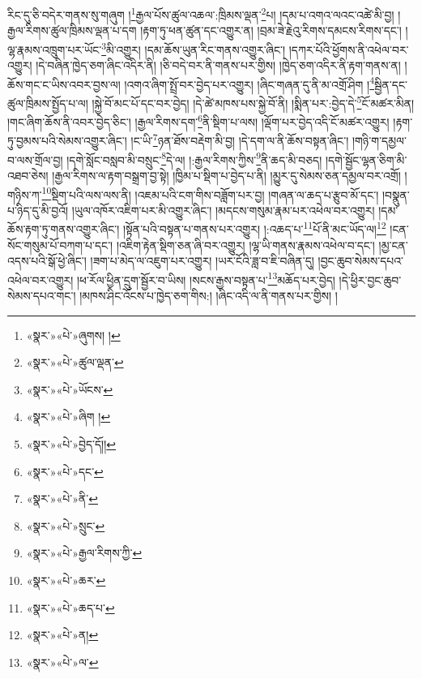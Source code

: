 རིང་དུ་ཅི་བདེར་གནས་སུ་གཞུག །\footnote{«སྣར་»«པེ་»ཞུགས། །}རྒྱལ་པོས་ཚུལ་འཆལ་:ཁྲིམས་ལྡན་\footnote{«སྣར་»«པེ་»ཚུལ་ལྡན་}པ། །དམ་པ་འགའ་ལའང་འཚེ་མི་བྱ། །རྒྱལ་རིགས་ཚུལ་ཁྲིམས་ལྡན་པ་དག །རྟག་ཏུ་ཕན་ཚུན་དང་འགྱུར་ན། །བྲམ་ཟེ་རྗེའུ་རིགས་དམངས་རིགས་དང་། །ལྷ་རྣམས་འཁྲུག་པར་ཡོང་\footnote{«སྣར་»«པེ་»ཡོངས་}མི་འགྱུར། །དམ་ཆོས་ཡུན་རིང་གནས་འགྱུར་ཞིང་། །དཀར་པོའི་ཕྱོགས་ནི་འཕེལ་བར་འགྱུར། །དེ་བཞིན་ཁྱེད་ཅག་ཞིང་འདིར་ནི། །ཅི་བདེ་བར་ནི་གནས་པར་གྱིས། །ཁྱེད་ཅག་འདིར་ནི་རྟག་གནས་ན། །ཆོས་གང་ང་ཡིས་འབར་བྱས་ལ། །འགའ་ཞིག་སྤྲོ་བར་བྱེད་པར་འགྱུར། །ཞིང་གཞན་དུ་ནི་མ་འགྲོ་ཤིག །\footnote{«སྣར་»«པེ་»ཞིག །}སྦྱིན་དང་ཚུལ་ཁྲིམས་སྤྱོད་པ་ལ། །སྐྱེ་བོ་མང་པོ་དང་བར་བྱེད། །དེ་ཚེ་མཁས་པས་སྐྱེ་བོ་ནི། །སྨིན་པར་:བྱེད་དེ་\footnote{«སྣར་»«པེ་»བྱེད་དོ།།}ངོ་མཚར་མིན། །གང་ཞིག་ཆོས་ནི་འབར་བྱེད་ཅིང་། །རྒྱལ་རིགས་དག་\footnote{«སྣར་»«པེ་»དང་}ནི་སྡིག་པ་ལས། །ལྡོག་པར་བྱེད་འདི་ངོ་མཚར་འགྱུར། །རྟག་ཏུ་བྱམས་པའི་སེམས་འགྱུར་ཞིང་། །ང་ཡི་\footnote{«སྣར་»«པེ་»ནི་}ཉན་ཐོས་བརྡེག་མི་བྱ། །དེ་དག་ལ་ནི་ཆོས་བསྟན་ཞིང་། །གཉི་ག་དམྱལ་བ་ལས་གྲོལ་བྱ། །དགེ་སློང་བསླབ་མི་བསྲུང་\footnote{«སྣར་»«པེ་»སྲུང་}དེ་ལ། །:རྒྱལ་རིགས་ཀྱིས་\footnote{«སྣར་»«པེ་»རྒྱལ་རིགས་ཀྱི་}ནི་ཆད་མི་བཅད། །དགེ་སྦྱོང་ལྷན་ཅིག་མི་འཐབ་ཅེས། །རྒྱལ་རིགས་ལ་རྟག་བསྒྲག་བྱ་སྟེ། །ཁྱིམ་པ་སྡིག་པ་བྱེད་པ་ནི། །མྱུར་དུ་སེམས་ཅན་དམྱལ་བར་འགྲོ། །གཉིས་ཀ་\footnote{«སྣར་»«པེ་»ཆར་}སྡིག་པའི་ལས་ལས་ནི། །འཇམ་པའི་ངག་གིས་བཟློག་པར་བྱ། །གཞན་ལ་ཆད་པ་རྩུབ་མོ་དང་། །བསྣུན་པ་ཉིད་དུ་མི་བྱའོ། །ཡུལ་འཁོར་འཇིག་པར་མི་འགྱུར་ཞིང་། །མདངས་གསུམ་རྣམ་པར་འཕེལ་བར་འགྱུར། །དམ་ཆོས་རྟག་ཏུ་གནས་འགྱུར་ཞིང་། །སྟོན་པའི་བསྟན་པ་གནས་པར་འགྱུར། །:འཆད་པ་\footnote{«སྣར་»«པེ་»ཆད་པ་}པོ་ནི་མང་ཡོད་ལ།\footnote{«སྣར་»«པེ་»ན།} །ངན་སོང་གསུམ་པོ་བཀག་པ་དང་། །འཇིག་རྟེན་སྡིག་ཅན་ཞི་བར་འགྱུར། །ལྷ་ཡི་གནས་རྣམས་འཕེལ་བ་དང་། །མྱ་ངན་འདས་པའི་སྒོ་ཕྱེ་ཞིང་། །ཟག་པ་མེད་ལ་འཇུག་པར་འགྱུར། །ཡར་ངོའི་ཟླ་བ་ཇི་བཞིན་དུ། །བྱང་ཆུབ་སེམས་དཔའ་འཕེལ་བར་འགྱུར། །ཕ་རོལ་ཕྱིན་དྲུག་སྦྱོར་བ་ཡིས། །སངས་རྒྱས་བསྟན་པ་\footnote{«སྣར་»«པེ་»ལ་}མཆོད་པར་བྱེད། །དེ་ཕྱིར་བྱང་ཆུབ་སེམས་དཔའ་གང་། །མཁས་ཤིང་འོངས་པ་ཁྱེད་ཅག་གིས:། །ཞིང་འདི་ལ་ནི་གནས་པར་གྱིས། །
